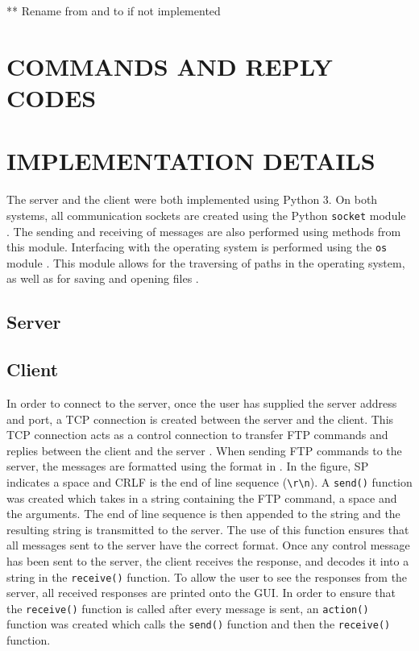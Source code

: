 \documentclass[10pt,twocolumn]{witseiepaper}
\newcommand*{\escape}[1]{\texttt{\textbackslash#1}}
\begin{document}
** Rename from and to if not implemented

\section{COMMANDS AND REPLY CODES}

\section{IMPLEMENTATION DETAILS}
The server and the client were both implemented using Python 3. On both systems, all communication sockets are created using the Python \texttt{socket} module \cite{socket}. The sending and receiving of messages are also performed using methods from this module. Interfacing with the operating system is performed using the \texttt{os} module \cite{os}. This module allows for the traversing of paths in the operating system, as well as for saving and opening files \cite{os}.

\subsection{Server}

\subsection{Client}
In order to connect to the server, once the user has supplied the server address and port, a TCP connection is created between the server and the client. This TCP connection acts as a control connection to transfer FTP commands and replies between the client and the server \cite{kurose}. When sending FTP commands to the server, the messages are formatted using the format in . In the figure, SP indicates a space and CRLF is the end of line sequence (\escape{r}\escape{n}). A \texttt{send()} function was created which takes in a string containing the FTP command, a space and the arguments. The end of line sequence is then appended to the string and the resulting string is transmitted to the server. The use of this function ensures that all messages sent to the server have the correct format. Once any control message has been sent to the server, the client receives the response, and decodes it into a string in the \texttt{receive()} function. To allow the user to see the responses from the server, all received responses are printed onto the GUI. In order to ensure that the \texttt{receive()} function is called after every message is sent, an \texttt{action()} function was created which calls the \texttt{send()} function and then the \texttt{receive()} function. 
\end{document}
